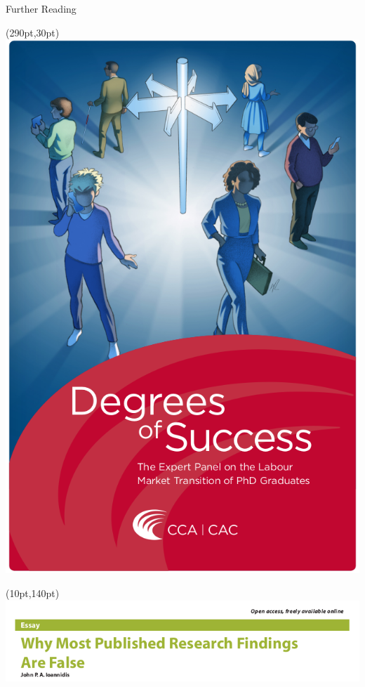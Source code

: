 \documentclass{beamer}
\begin{document}
\begin{frame}{Further Reading}
	\begin{textblock*}{60pt}(290pt,30pt)
		\includegraphics[width=1\textwidth]{../images/degreesofsuccess.png}
	\end{textblock*}

	\begin{textblock*}{190pt}(10pt,140pt)
		\includegraphics[width=1\textwidth]{../images/moststudiesfalse.png}
	\end{textblock*}


\end{frame}
\end{document}
